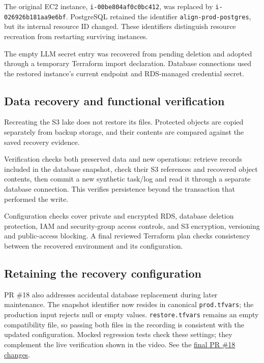 \documentclass[11pt]{article}
\newcommand{\code}[1]{\texttt{#1}}
\begin{document}
The original EC2 instance, \code{i-00be804af0c0bc412}, was replaced by \code{i-026926b181aa9e6bf}. PostgreSQL retained the identifier \code{align-prod-postgres}, but its internal resource ID changed. These identifiers distinguish resource recreation from restarting surviving instances.

The empty LLM secret entry was recovered from pending deletion and adopted through a temporary Terraform import declaration. Database connections used the restored instance's current endpoint and RDS-managed credential secret.

\subsection*{Data recovery and functional verification}

Recreating the S3 lake does not restore its files. Protected objects are copied separately from backup storage, and their contents are compared against the saved recovery evidence.

Verification checks both preserved data and new operations: retrieve records included in the database snapshot, check their S3 references and recovered object contents, then commit a new synthetic task/log and read it through a separate database connection. This verifies persistence beyond the transaction that performed the write.

Configuration checks cover private and encrypted RDS, database deletion protection, IAM and security-group access controls, and S3 encryption, versioning and public-access blocking. A final reviewed Terraform plan checks consistency between the recovered environment and its configuration.

\subsection*{Retaining the recovery configuration}

PR \#18 also addresses accidental database replacement during later maintenance. The snapshot identifier now resides in canonical \code{prod.tfvars}; the production input rejects null or empty values. \code{restore.tfvars} remains an empty compatibility file, so passing both files in the recording is consistent with the updated configuration. Mocked regression tests check these settings; they complement the live verification shown in the video. See the \href{https://github.com/UofT-CSC490-F2026/ALIGN/pull/18/files}{final PR \#18 changes}.
\end{document}
